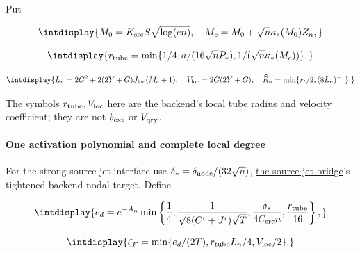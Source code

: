 
Put


\begingroup\renewcommand{\theHequation}{intdisplay.262}
\begin{equation*}
\intdisplay{
M_0=K_{\rm src}S\sqrt{\log(en)},\quad
M_c=M_0+\sqrt n\kappa_*(M_0)Z_n,
}
\end{equation*}
\endgroup

\begingroup\renewcommand{\theHequation}{intdisplay.263}
\begin{equation*}
\intdisplay{
r_{\rm tube}=\min\{1/4,a/(16\sqrt nP_*),1/(\sqrt n\kappa_*(M_c))\},
}
\end{equation*}
\endgroup

\begingroup\renewcommand{\theHequation}{intdisplay.264}
\begin{equation*}
\intdisplay{
L_n=2G^2+2(2Y+G)J_{\rm loc}(M_c+1),\quad
V_{\rm loc}=2G(2Y+G),\quad
\widehat R_n=\min\{r_t/2,(8L_n)^{-1}\}.
}
\end{equation*}
\endgroup


The symbols \(r_{\rm tube},\allowbreak V_{\rm loc}\) here are the backend's local tube radius and velocity coefficient; they are not \(b_{\rm ext}\) or \(V_{\rm qry}\).


\paragraph{One activation polynomial and complete local degree}
\label{int:setup-orders-detail-8}
\mbox{}\par\smallskip


For the strong source-jet interface use \(\delta_*=\delta_{\rm node}/(32\sqrt n)\), \hyperref[int:setup-bridge]{the source-jet bridge}'s tightened backend nodal target. Define


\begingroup\renewcommand{\theHequation}{intdisplay.265}
\begin{equation*}
\intdisplay{
e_d=e^{-A_n}\min\left\{
\frac14,\frac1{\sqrt8(C^{\rm r}+J^{\rm r})\sqrt T},
\frac{\delta_*}{4C_{\rm src}n},\frac{r_{\rm tube}}{16}\right\},
}
\end{equation*}
\endgroup

\begingroup\renewcommand{\theHequation}{intdisplay.266}
\begin{equation*}
\intdisplay{
\zeta_F=\min\{e_d/(2T),r_{\rm tube}L_n/4,V_{\rm loc}/2\}.
}
\end{equation*}
\endgroup

